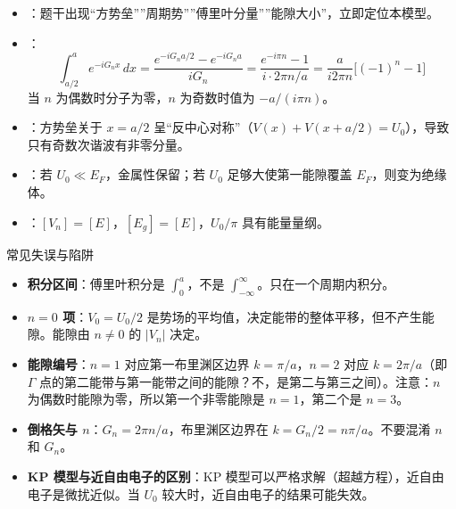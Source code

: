 \begin{tipbox}[快速识别与解题技巧]
\begin{itemize}
    \item {}：题干出现``方势垒''''周期势''''傅里叶分量''''能隙大小''，立即定位本模型。
    \item {}：
    \[
    \int_{a/2}^{a}e^{-iG_n x}\,dx=\frac{e^{-iG_n a/2}-e^{-iG_n a}}{iG_n}
    =\frac{e^{-i\pi n}-1}{i\cdot 2\pi n/a}=\frac{a}{i2\pi n}\bigl[(-1)^n-1\bigr]
    \]
    当 $n$ 为偶数时分子为零，$n$ 为奇数时值为 $-a/(i\pi n)$。
    \item {}：方势垒关于 $x=a/2$ 呈``反中心对称''（$V(x)+V(x+a/2)=U_0$），导致只有奇数次谐波有非零分量。
    \item {}：若 $U_0\ll E_F$，金属性保留；若 $U_0$ 足够大使第一能隙覆盖 $E_F$，则变为绝缘体。
    \item {}：$[V_n]=[E]$，$[E_g]=[E]$，$U_0/\pi$ 具有能量量纲。
\end{itemize}
\end{tipbox}

\begin{errorbox}{常见失误与陷阱}
\begin{itemize}
    \item \textbf{积分区间}：傅里叶积分是 $\int_0^a$，不是 $\int_{-\infty}^{\infty}$。只在一个周期内积分。
    \item \textbf{$n=0$ 项}：$V_0=U_0/2$ 是势场的平均值，决定能带的整体平移，但不产生能隙。能隙由 $n\neq0$ 的 $|V_n|$ 决定。
    \item \textbf{能隙编号}：$n=1$ 对应第一布里渊区边界 $k=\pi/a$，$n=2$ 对应 $k=2\pi/a$（即 $\Gamma$ 点的第二能带与第一能带之间的能隙？不，是第二与第三之间）。注意：$n$ 为偶数时能隙为零，所以第一个非零能隙是 $n=1$，第二个是 $n=3$。
    \item \textbf{倒格矢与 $n$}：$G_n=2\pi n/a$，布里渊区边界在 $k=G_n/2=n\pi/a$。不要混淆 $n$ 和 $G_n$。
    \item \textbf{KP 模型与近自由电子的区别}：KP 模型可以严格求解（超越方程），近自由电子是微扰近似。当 $U_0$ 较大时，近自由电子的结果可能失效。
\end{itemize}
\end{errorbox}

